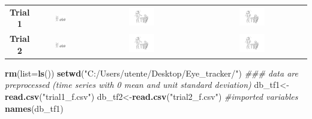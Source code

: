 \documentclass[]{article}
\newenvironment{Shaded}{\begin{snugshade}}{\end{snugshade}}
\newcommand{\CommentTok}[1]{\textcolor[rgb]{0.56,0.35,0.01}{\textit{#1}}}
\newcommand{\DataTypeTok}[1]{\textcolor[rgb]{0.13,0.29,0.53}{#1}}
\newcommand{\KeywordTok}[1]{\textcolor[rgb]{0.13,0.29,0.53}{\textbf{#1}}}
\newcommand{\NormalTok}[1]{#1}
\newcommand{\StringTok}[1]{\textcolor[rgb]{0.31,0.60,0.02}{#1}}
\begin{document}
\begin{tabular}{cccc}
\textbf{Trial 1}& \includegraphics[width=0.25\textwidth]{ambigua.jpg} & \includegraphics[width=0.25\textwidth]{maestra cattiva.jpg}& \includegraphics[width=0.25\textwidth]{maestra-ostile-bambino-ostile.jpg}\\
\textbf{Trial 2}& \includegraphics[width=0.25\textwidth]{ambigua.jpg} &\includegraphics[width=0.25\textwidth]{maestra cattiva.jpg} & \includegraphics[width=0.25\textwidth]{maestra-ostile-bambino-buono.jpg}\\
\end{tabular}

\begin{Shaded}
\begin{Highlighting}[]
\KeywordTok{rm}\NormalTok{(}\DataTypeTok{list=}\KeywordTok{ls}\NormalTok{())}
\KeywordTok{setwd}\NormalTok{(}\StringTok{"C:/Users/utente/Desktop/Eye_tracker/"}\NormalTok{)}
\CommentTok{### data are preprocessed (time series with 0 mean and unit standard deviation)}
\NormalTok{db_tf1<-}\KeywordTok{read.csv}\NormalTok{(}\StringTok{"trial1_f.csv"}\NormalTok{)}
\NormalTok{db_tf2<-}\KeywordTok{read.csv}\NormalTok{(}\StringTok{"trial2_f.csv"}\NormalTok{)}
\CommentTok{#imported variables}
\KeywordTok{names}\NormalTok{(db_tf1)}
\end{Highlighting}
\end{Shaded}
\end{document}
